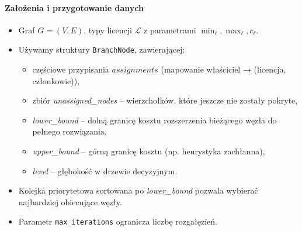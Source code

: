 \paragraph{Założenia i przygotowanie danych}  
\begin{itemize}
  \item Graf $G=(V,E)$, typy licencji $\mathcal{L}$ z parametrami $\min_\ell,\max_\ell,c_\ell$.
  \item Używamy struktury \texttt{BranchNode}, zawierającej:
    \begin{itemize}
      \item częściowe przypisania $\textit{assignments}$ (mapowanie właściciel → (licencja, członkowie)),
      \item zbiór \textit{unassigned\_nodes} – wierzchołków, które jeszcze nie zostały pokryte,
      \item \textit{lower\_bound} – dolną granicę kosztu rozszerzenia bieżącego węzła do pełnego rozwiązania,
      \item \textit{upper\_bound} – górną granicę kosztu (np. heurystyka zachłanna),
      \item \textit{level} – głębokość w drzewie decyzyjnym.
    \end{itemize}
  \item Kolejka priorytetowa sortowana po \textit{lower\_bound} pozwala wybierać najbardziej obiecujące węzły.
  \item Parametr \texttt{max\_iterations} ogranicza liczbę rozgałęzień.
\end{itemize}

